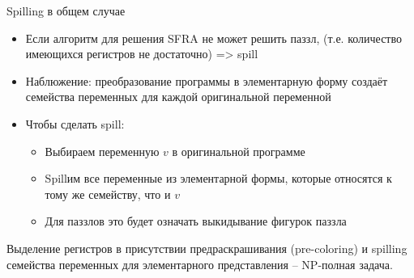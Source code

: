 \documentclass[aspectratio=169
  , xcolor={svgnames}
  , hyperref={ colorlinks,citecolor=DeepPink4
             , linkcolor=DarkRed,urlcolor=DarkBlue}
  , russian
  ]{beamer}
\theoremstyle{exerciseStyle1}
\begin{document}
\begin{frame}{Spilling в общем случае}
\begin{itemize}
\item Если алгоритм для решения SFRA не может решить паззл, (т.е. количество имеющихся регистров не достаточно) => spill
\item Наблюжение: преобразование программы в элементарную форму создаёт семейства переменных для каждой оригинальной переменной %
\item Чтобы сделать spill:
\begin{itemize}
\item Выбираем переменную $v$ в оригинальной программе
\item Spillим все переменные из элементарной формы, которые относятся к тому же семейству, что и $v$
\item Для паззлов это будет означать выкидывание фигурок паззла
\end{itemize}
\end{itemize}

\begin{theorem}[Сложность]
Выделение регистров в присутствии предраскрашивания (pre-coloring) и spilling семейства переменных для элементарного представления -- NP-полная задача.
\end{theorem}
\end{frame}
\end{document}
